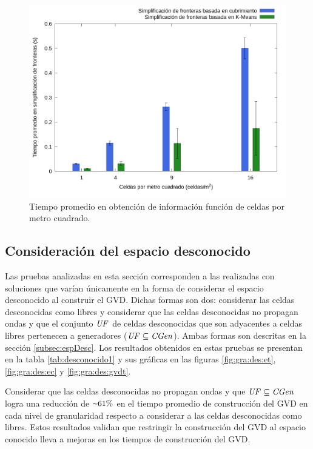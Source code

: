 \begin{figure}[H]
  \centerfloat

  \includegraphics[clip=true, width=\graphlen]{imagenes/graficas_chicas/graficas_histo_num/ident_obj/obj_id_time_mean.png}

  \caption{Tiempo promedio en obtención de información función de celdas por metro cuadrado.}\label{fig:gra:idobj:iobt}

\end{figure}

\subsection{Consideración del espacio desconocido}\label{sec:exp:desco}

Las pruebas analizadas en esta sección corresponden a las realizadas con
soluciones que varían únicamente en la forma de considerar el espacio
desconocido al construir el GVD. Dichas formas son dos: considerar las
celdas desconocidas como libres y considerar que las celdas desconocidas no
propagan ondas y que el conjunto $\mathit{UF}$ de celdas desconocidas que son
adyacentes a celdas libres pertenecen a generadores ($\mathit{UF} \subseteq
\mathit{CGen}$). Ambas formas son descritas en la sección \ref{subsec:espDesc}. Los
resultados obtenidos en estas pruebas se presentan en la tabla \ref{tab:desconocido1} y sus
gráficas en las figuras \ref{fig:gra:des:et}, \ref{fig:gra:des:ec} y
\ref{fig:gra:des:gvdt}.

Considerar que las celdas desconocidas no propagan ondas y que $\mathit{UF}
\subseteq \mathit{CGen}$ logra una reducción de ${\smallsim}61\%$ en el tiempo
promedio de construcción del GVD en cada nivel de granularidad respecto a
considerar a las celdas desconocidas como libres. Estos resultados validan que
restringir la construcción del GVD al espacio conocido lleva a mejoras en los
tiempos de construcción del GVD. 


